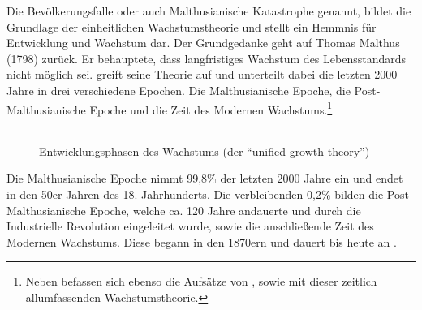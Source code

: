 %
Die Bevölkerungsfalle oder auch Malthusianische Katastrophe genannt, bildet die Grundlage der einheitlichen Wachstumstheorie und stellt ein Hemmnis für Entwicklung und Wachstum dar. Der Grundgedanke geht auf Thomas Malthus (1798) zurück. Er behauptete, dass langfristiges Wachstum des Lebensstandards nicht möglich sei. \cite{Galor.2011} greift seine Theorie auf und unterteilt dabei die letzten 2000 Jahre in drei verschiedene Epochen. Die Malthusianische Epoche, die Post-Malthusianische Epoche und die Zeit des Modernen Wachstums.\footnote{Neben \cite{Galor.2006} befassen sich ebenso die Aufsätze von \cite{Hansen.2002}, sowie \cite{Ashraf.2008} mit dieser zeitlich allumfassenden Wachstumstheorie.}\\

		\begin{figure}[htbp]
			\centering 
			\begin{tabular}{@{}r@{}}  
			\end{tabular}
			\caption[Entwicklungsphasen des Wachstums]{Entwicklungsphasen des Wachstums (der "`unified growth theory"')}\label{Epochen}
		\end{figure}
%		
Die Malthusianische Epoche nimmt 99,8{\%} der letzten 2000 Jahre ein und endet in den 50er Jahren des 18. Jahrhunderts. Die verbleibenden 0,2{\%} bilden die Post-Malthusianische Epoche, welche ca. 120 Jahre andauerte und durch die Industrielle Revolution eingeleitet wurde, sowie die anschließende Zeit des Modernen Wachstums. Diese begann in den 1870ern und dauert bis heute an \cite{Galor.2014}.\\
%
